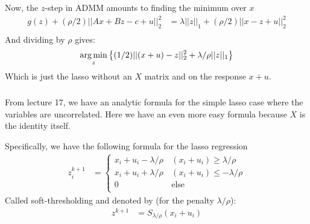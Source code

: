 \begin{frame}[fragile] \frametitle{}

Now, the $z$-step in ADMM amounts to finding the minimum over $x$
\begin{align*}
g(z) + (\rho / 2) || Ax + Bz - c + u ||_2^2
&= \lambda || z ||_1 + (\rho / 2) || x - z + u ||_2^2 \\
\end{align*}
And dividing by $\rho$ gives:
\begin{align*}
\mathop{\mathrm{arg\,min}}_z \left\{ (1 / 2) || (x + u) - z ||_2^2 + \lambda / \rho || z ||_1 \right\} \\
\end{align*}
Which is just the lasso without an $X$ matrix and on the response $x + u$.

\end{frame}

\begin{frame}[fragile] \frametitle{}

From lecture 17, we have an analytic formula for the simple lasso case
where the variables are uncorrelated. Here we have an even more easy
formula because $X$ is the identity itself.

\pause Specifically, we have the following formula for the lasso regression
\begin{align*}
z^{k+1}_i &= \left\{ \begin{array}{ll}
x_i + u_i - \lambda / \rho &\, (x_i + u_i) \geq \lambda / \rho \\
x_i + u_i + \lambda / \rho &\, (x_i + u_i) \leq -\lambda / \rho \\
0 &\, \text{else} \\
\end{array} \right.
\end{align*}
Called soft-thresholding and denoted by (for the penalty $\lambda / \rho$):
\begin{align*}
z^{k+1} &= S_{\lambda / \rho} (x_i + u_i)
\end{align*}

\end{frame}

